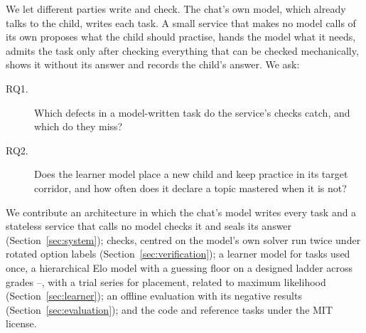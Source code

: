 We let different parties write and check. The chat's own model, which already talks to the child, writes each task. A small service that makes no model calls of its own proposes what the child should practise, hands the model what it needs, admits the task only after checking everything that can be checked mechanically, shows it without its answer and records the child's answer. We ask:
\begin{description}
\item[RQ1.] Which defects in a model-written task do the service's checks catch, and which do they miss?
\item[RQ2.] Does the learner model place a new child and keep practice in its target corridor, and how often does it declare a topic mastered when it is not?
\end{description}
We contribute an architecture in which the chat's model writes every task and a stateless service that calls no model checks it and seals its answer (Section~\ref{sec:system});  checks, centred on the model's own solver run twice under rotated option labels (Section~\ref{sec:verification}); a learner model for tasks used once, a hierarchical Elo model with a guessing floor on a designed ladder across grades --, with a trial series for placement, related to maximum likelihood (Section~\ref{sec:learner}); an offline evaluation with its negative results (Section~\ref{sec:evaluation}); and the code and  reference tasks under the MIT license.
